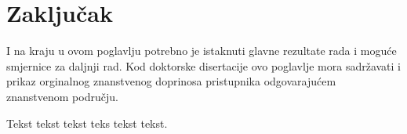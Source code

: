 \chapter{Zaklju\v{c}ak}
I na kraju u ovom poglavlju potrebno je istaknuti glavne rezultate
rada i mogu\'{c}e smjernice za daljnji rad. Kod doktorske disertacije
ovo poglavlje mora sadr\v{z}avati i prikaz orginalnog znanstvenog
doprinosa pristupnika odgovaraju\'{c}em znanstvenom podru\v{c}ju.

Tekst tekst tekst teks tekst tekst. %

